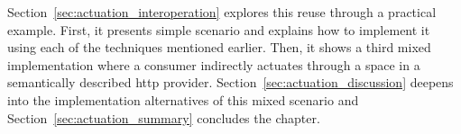 Section~\ref{sec:actuation_interoperation} explores this reuse through a practical example.
First, it presents simple scenario and explains how to implement it using each of the techniques mentioned earlier.
Then, it shows a third mixed implementation where a consumer indirectly actuates through a space in a semantically described \acs{http} provider. %
Section~\ref{sec:actuation_discussion} deepens into the implementation alternatives of this mixed scenario
and Section~\ref{sec:actuation_summary} concludes the chapter.









